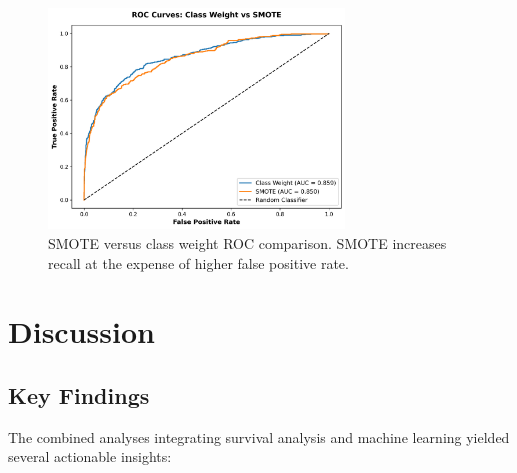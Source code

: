 \documentclass[12pt]{article}
\begin{document}
\begin{figure}[H]
\centering
\includegraphics[width=0.7\textwidth]{img/25_smote_roc_comparison.png}
\caption{SMOTE versus class weight ROC comparison. SMOTE increases recall at the expense of higher false positive rate.}
\label{fig:smote_roc}
\end{figure}

\section{Discussion}
\subsection{Key Findings}
The combined analyses integrating survival analysis and machine learning yielded several actionable insights:
\end{document}
